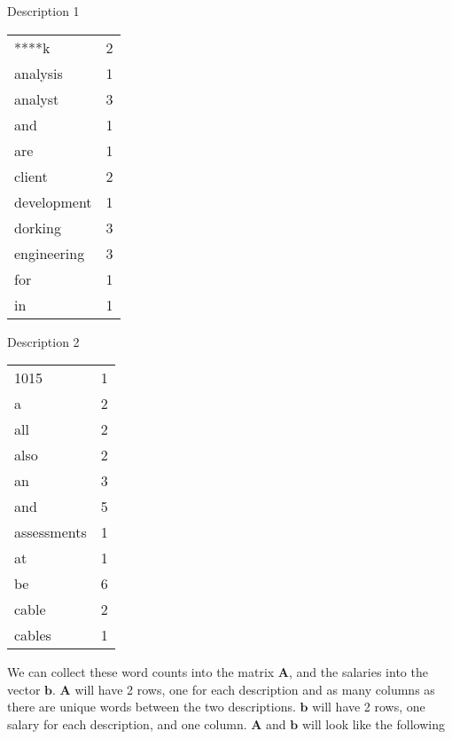 \documentclass[12pt]{article}
\begin{document}

    \begin{center}
    \begin{minipage}[t]{.4\textwidth}
    Description 1
    \newline
    \newline
        \begin{tabular}{l|c}
            ****k & 2 \\
            analysis & 1\\
            analyst & 3\\
            and & 1\\
            are & 1\\
            client & 2\\
            development & 1\\
            dorking & 3\\
            engineering & 3\\
            for & 1\\
            in & 1 \\
        \end{tabular}
    \end{minipage}
    \begin{minipage}[t]{.4\textwidth}
    Description 2
    \newline
    \newline
        \begin{tabular}{l|c}
            1015 & 1 \\
            a & 2 \\
            all & 2 \\
            also & 2\\
            an & 3 \\
            and & 5 \\
            assessments & 1 \\
            at & 1 \\
            be & 6 \\
            cable & 2 \\
            cables & 1\\
        \end{tabular}
    \end{minipage}
    \end{center}

    We can collect these word counts into the matrix $\bm{A}$, and the salaries
    into the vector $\bm{b}$. $\bm{A}$ will have 2 rows, one for each
    description and as many columns as there are unique words between the two
    descriptions. $\bm{b}$ will have 2 rows, one salary for each description,
    and one column. $\bm{A}$ and $\bm{b}$ will look like the following
\end{document}
